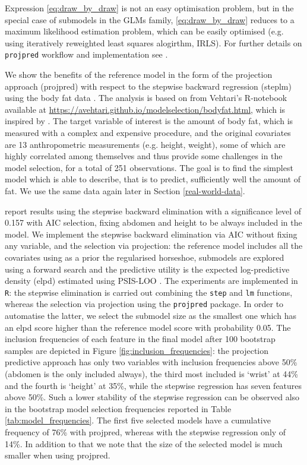 \documentclass[american,]{article}
\theoremstyle{definition}
\begin{document}
Expression \eqref{eq:draw_by_draw} is not an easy optimisation problem, but in the special case of submodels in the GLMs family, \eqref{eq:draw_by_draw} reduces to a maximum likelihood estimation problem, which can be easily optimised (e.g. using iteratively reweighted least squares alogirthm, IRLS). For further details on \texttt{projpred} workflow and implementation see \cite{paper:projpred}.

We show the benefits of the reference model in the form of the projection approach (projpred) with respect to the stepwise backward regression (steplm) using the body fat data \citep{johnson1996fitting}. The analysis is based on from Vehtari's R-notebook available at \url{https://avehtari.github.io/modelselection/bodyfat.html}, which is inspired by \cite{paper:bodyfat}. The target variable of interest is the amount of body fat, which is measured with a complex and expensive procedure, and the original covariates are 13 anthropometric measurements (e.g. height, weight), some of which are highly correlated among themselves and thus provide some challenges in the model selection, for a total of 251 observations. The goal is to find the simplest model which is able to describe, that is to predict, sufficiently well the amount of fat. We use the same data again later in Section \ref{real-world-data}.

\cite{paper:bodyfat} report results using the stepwise backward elimination with a significance level of 0.157 with AIC selection, fixing abdomen and height to be always included in the model. We implement the stepwise backward elimination via AIC without fixing any variable, and the selection via projection: the reference model includes all the covariates using as a prior the regularised horseshoe, submodels are explored using a forward search and the predictive utility is the expected log-predictive density (elpd) estimated using PSIS-LOO \citep{paper:psis_loo}. The experiments are implemented in \texttt{R}: the stepwise elimination is carried out combining the \texttt{step} and \texttt{lm} functions, whereas the selection via projection using the \texttt{projpred} package. In order to automatise the latter, we select the submodel size as the smallest one which has an elpd score higher than the reference model score with probability 0.05. The inclusion frequencies of each feature in the final model after 100 bootstrap samples are depicted in Figure \ref{fig:inclusion_frequencies}: the projection predictive approach has only two variables with inclusion frequencies above 50\% (abdomen is the only included always), the third most included is `wrist' at 44\% and the fourth is `height' at 35\%, while the stepwise regression has seven features above 50\%. Such a lower stability of the stepwise regression can be observed also in the bootstrap model selection frequencies reported in Table \ref{tab:model_frequencies}. The first five selected models have a cumulative frequency of 76\% with projpred, whereas with the stepwise regression only of 14\%. In addition to that we note that the size of the selected model is much smaller when using projpred.
\end{document}
